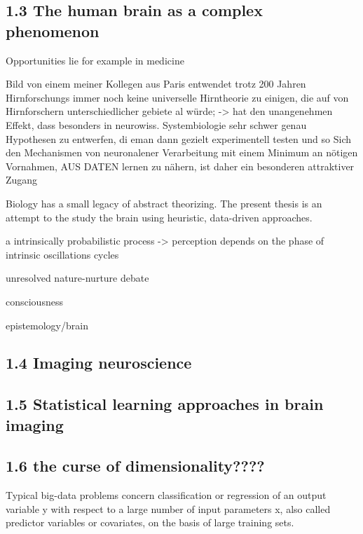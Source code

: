\documentclass[authoryear,review,3p]{elsarticle}
\begin{document}
\subsection*{1.3 The human brain as a complex phenomenon}

Opportunities lie for example in medicine

Bild von einem meiner Kollegen aus Paris entwendet
trotz 200 Jahren Hirnforschungs immer noch keine universelle Hirntheorie zu einigen, die auf von Hirnforschern unterschiedlicher gebiete al würde;
-> hat den unangenehmen Effekt, dass besonders in neurowiss. Systembiologie sehr schwer genau Hypothesen zu entwerfen, di eman dann gezielt experimentell testen und so
Sich den Mechanismen von neuronalener Verarbeitung mit einem Minimum an nötigen Vornahmen, AUS DATEN lernen zu nähern, ist daher ein besonderen attraktiver Zugang



Biology has a small legacy of abstract theorizing.
The present thesis is an attempt to the study the brain using
heuristic, data-driven approaches.

a intrinsically probabilistic process
-> perception depends on the phase of intrinsic oscillations cycles

unresolved nature-nurture debate

consciousness


epistemology/brain




\subsection*{1.4 Imaging neuroscience}






\subsection*{1.5 Statistical learning approaches in brain imaging}





\subsection*{1.6 the curse of dimensionality????}




Typical big-data problems concern classification or regression of an output variable y with respect to a large number of input parameters x, also called predictor variables or covariates, on the basis of large training sets. 
\end{document}
